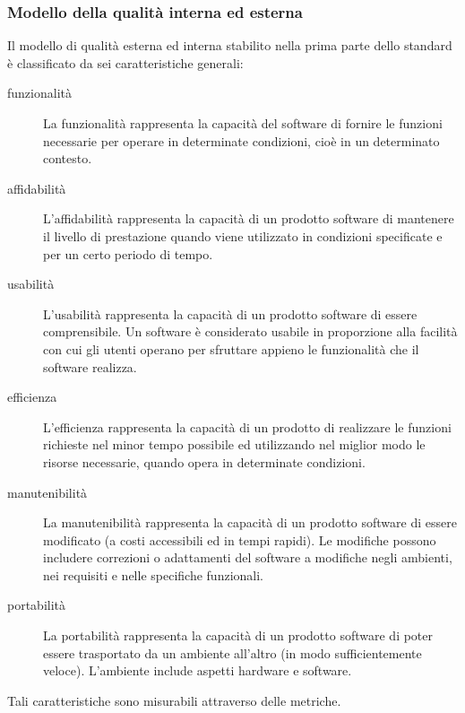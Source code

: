 		\subsubsection{Modello della qualità interna ed esterna}
			Il modello di qualità esterna ed interna stabilito nella prima parte dello standard è classificato da sei caratteristiche generali:
			\begin{description}
				\item[funzionalità] La funzionalità rappresenta la capacità del software di fornire le funzioni necessarie per operare in determinate condizioni, cioè in un determinato contesto.
				\item[affidabilità] L'affidabilità rappresenta la capacità di un prodotto software di mantenere il livello di prestazione quando viene utilizzato in condizioni specificate e per un certo periodo di tempo.
				\item[usabilità] L'usabilità rappresenta la capacità di un prodotto software di essere comprensibile. Un software è considerato usabile in proporzione alla facilità con cui gli utenti operano per sfruttare appieno le funzionalità che il software realizza.
				\item[efficienza] L'efficienza rappresenta la capacità di un prodotto di realizzare le funzioni richieste nel minor tempo possibile ed utilizzando nel miglior modo le risorse necessarie, quando opera in determinate condizioni.
				\item[manutenibilità] La manutenibilità rappresenta la capacità di un prodotto software di essere modificato (a costi accessibili ed in tempi rapidi). Le modifiche possono includere correzioni o adattamenti del software a modifiche negli ambienti, nei requisiti e nelle specifiche funzionali.
				\item[portabilità] La portabilità rappresenta la capacità di un prodotto software di poter essere trasportato da un ambiente all'altro (in modo sufficientemente veloce). L'ambiente include aspetti hardware e software.
			\end{description}
			Tali caratteristiche sono misurabili attraverso delle metriche.
